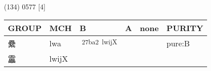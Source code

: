 \documentclass[14pt,a4paper]{scrartcl}
\begin{document}
(134) 0577 {[}4{]}

\begin{longtable}[c]{@{}llllll@{}}
\toprule
\begin{minipage}[b]{0.14\columnwidth}\raggedright\strut
GROUP
\strut\end{minipage} &
\begin{minipage}[b]{0.14\columnwidth}\raggedright\strut
MCH
\strut\end{minipage} &
\begin{minipage}[b]{0.14\columnwidth}\raggedright\strut
B
\strut\end{minipage} &
\begin{minipage}[b]{0.14\columnwidth}\raggedright\strut
A
\strut\end{minipage} &
\begin{minipage}[b]{0.14\columnwidth}\raggedright\strut
none
\strut\end{minipage} &
\begin{minipage}[b]{0.14\columnwidth}\raggedright\strut
PURITY
\strut\end{minipage}\tabularnewline
\midrule
\endhead
\begin{minipage}[t]{0.14\columnwidth}\raggedright\strut
纍
\strut\end{minipage} &
\begin{minipage}[t]{0.14\columnwidth}\raggedright\strut
lwa
\strut\end{minipage} &
\begin{minipage}[t]{0.14\columnwidth}\raggedright\strut
𧮢\textsuperscript{27ba2~lwijX}
\strut\end{minipage} &
\begin{minipage}[t]{0.14\columnwidth}\raggedright\strut
\strut\end{minipage} &
\begin{minipage}[t]{0.14\columnwidth}\raggedright\strut
\strut\end{minipage} &
\begin{minipage}[t]{0.14\columnwidth}\raggedright\strut
pure:B
\strut\end{minipage}\tabularnewline
\begin{minipage}[t]{0.14\columnwidth}\raggedright\strut
靁
\strut\end{minipage} &
\begin{minipage}[t]{0.14\columnwidth}\raggedright\strut
lwijX
\strut\end{minipage} &
\begin{minipage}[t]{0.14\columnwidth}\raggedright\strut
\strut\end{minipage} &

\end{longtable}
\end{document}
